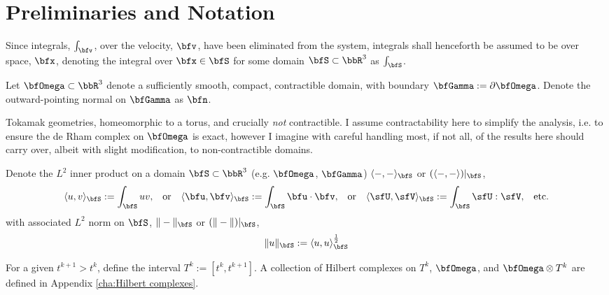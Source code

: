 \section*{Preliminaries and Notation}
    Since integrals, $\int_{\bfv}$, over the velocity, $\bfv$, have been eliminated from the system, integrals shall henceforth be assumed to be over space, $\bfx$, denoting the integral over $\bfx  \in  \bfS$ for some domain $\bfS  \subset  \bbR^{3}$ as $\int_{\bfS}$.

    Let $\bfOmega  \subset  \bbR^{3}$ denote a sufficiently smooth, compact, contractible domain, with boundary $\bfGamma  :=  \partial\bfOmega$. Denote the outward-pointing normal on $\bfGamma$ as $\bfn$.

    \begin{remark}
        Tokamak geometries, homeomorphic to a torus, and crucially \emph{not} contractible. I assume contractability here to simplify the analysis, i.e. to ensure the de Rham complex on $\bfOmega$ is exact, however I imagine with careful handling most, if not all, of the results here should carry over, albeit with slight modification, to non-contractible domains.
    \end{remark}
    
    Denote the $L^{2}$ inner product on a domain $\bfS  \subset  \bbR^{3}$ (e.g. $\bfOmega$, $\bfGamma$) $\langle-, -\rangle_{\bfS}$ or $(\langle-, -\rangle)|_{\bfS}$,
    \begin{align}
        \langle u,    v   \rangle_{\bfS}  :=  \int_{\bfS}uv,  &&
        \text{or}  &&
        \langle \bfu, \bfv\rangle_{\bfS}  :=  \int_{\bfS}\bfu\cdot\bfv,  &&
        \text{or}  &&
        \langle \sfU, \sfV\rangle_{\bfS}  :=  \int_{\bfS}\sfU:\sfV,  &&
        \text{etc.}
    \end{align}
    with associated $L^{2}$ norm on $\bfS$, $\|-\|_{\bfS}$ or $(\|-\|)|_{\bfS}$,
    \begin{equation}
        \|u\|_{\bfS}  :=  \langle u, u\rangle_{\bfS}^{\frac{1}{2}}
    \end{equation}

    For a given $t^{k + 1} > t^{k}$, define the interval $T^{k}  :=  \left[t^{k}, t^{k + 1}\right]$. A collection of Hilbert complexes on $T^{k}$, $\bfOmega$, and $\bfOmega\otimes T^{k}$ are defined in Appendix \ref{cha:Hilbert complexes}.
    